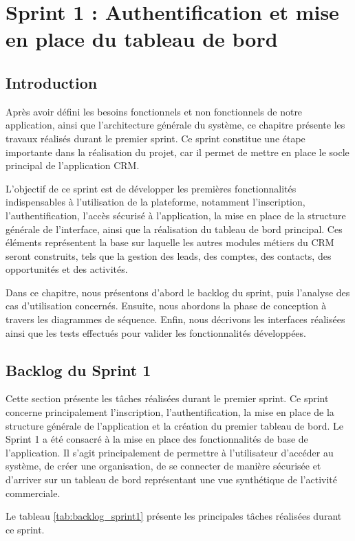 \documentclass[12pt,a4paper,twoside,openany]{book}
\begin{document}
\chapter{Sprint 1 : Authentification et mise en place du tableau de bord}

\section*{Introduction}

Après avoir défini les besoins fonctionnels et non fonctionnels de notre application, ainsi que l’architecture générale du système, ce chapitre présente les travaux réalisés durant le premier sprint. Ce sprint constitue une étape importante dans la réalisation du projet, car il permet de mettre en place le socle principal de l’application CRM.

L’objectif de ce sprint est de développer les premières fonctionnalités indispensables à l’utilisation de la plateforme, notamment l’inscription, l’authentification, l’accès sécurisé à l’application, la mise en place de la structure générale de l’interface, ainsi que la réalisation du tableau de bord principal. Ces éléments représentent la base sur laquelle les autres modules métiers du CRM seront construits, tels que la gestion des leads, des comptes, des contacts, des opportunités et des activités.

Dans ce chapitre, nous présentons d’abord le backlog du sprint, puis l’analyse des cas d’utilisation concernés. Ensuite, nous abordons la phase de conception à travers les diagrammes de séquence. Enfin, nous décrivons les interfaces réalisées ainsi que les tests effectués pour valider les fonctionnalités développées.

\section{Backlog du Sprint 1}
Cette section présente les tâches réalisées durant le premier sprint. Ce sprint concerne principalement l’inscription, l’authentification, la mise en place de la structure générale de l’application et la création du premier tableau de bord.
Le Sprint 1 a été consacré à la mise en place des fonctionnalités de base de l’application. Il s’agit principalement de permettre à l’utilisateur d’accéder au système, de créer une organisation, de se connecter de manière sécurisée et d’arriver sur un tableau de bord représentant une vue synthétique de l’activité commerciale.

Le tableau \ref{tab:backlog_sprint1} présente les principales tâches réalisées durant ce sprint.
\end{document}
